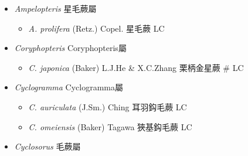 
  \begin{itemize}
 \item[] \textit{Ampelopteris} 星毛蕨屬
                                
  \begin{itemize}
        \item[] \textit{A. prolifera} (Retz.) Copel.  星毛蕨   LC
  \end{itemize}
 \item[] \textit{Coryphopteris} Coryphopteris屬
                                
  \begin{itemize}
        \item[] \textit{C. japonica} (Baker) L.J.He \& X.C.Zhang  栗柄金星蕨  \# LC
  \end{itemize}
 \item[] \textit{Cyclogramma} Cyclogramma屬
                                
  \begin{itemize}
        \item[] \textit{C. auriculata} (J.Sm.) Ching  耳羽鈎毛蕨   LC
        \item[] \textit{C. omeiensis} (Baker) Tagawa  狹基鈎毛蕨   LC
  \end{itemize}
 \item[] \textit{Cyclosorus} 毛蕨屬
                                

\end{itemize}
